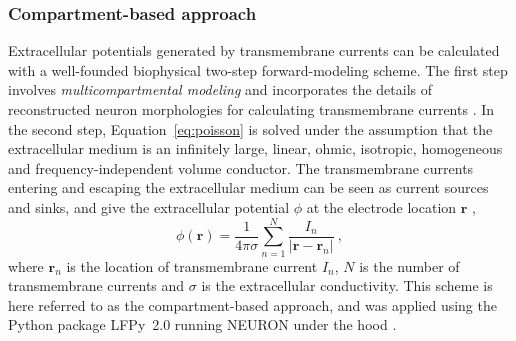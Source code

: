 \documentclass[preprint,10pt,authoryear]{elsarticle}
\begin{document}
\subsubsection{Compartment-based approach}\label{subsubsec:multicomp}
Extracellular potentials generated by transmembrane currents can be calculated with a well-founded biophysical two-step forward-modeling scheme. The first step involves \textit{multicompartmental modeling} and incorporates the details of reconstructed neuron morphologies for calculating transmembrane currents \citep{STERRATT2011}. In the second step, Equation~\eqref{eq:poisson} is solved under the assumption that the extracellular medium is an infinitely large, linear, ohmic, isotropic, homogeneous and frequency-independent volume conductor. The transmembrane currents entering and escaping the extracellular medium can be seen as current sources and sinks, and give the extracellular potential $\phi$ at the electrode location $\mathbf{r}$ \citep{Ness2020},
\begin{equation}
\phi(\mathbf{r}) = \frac{1}{4 \pi \sigma}\sum_{n=1}^N \frac{I_n}{|\mathbf{r} - \mathbf{r}_n|}~,
\label{eq:point_source}
\end{equation}
where $\mathbf{r}_n$ is the location of transmembrane current $I_n$, $N$ is the number of transmembrane currents and $\sigma$ is the extracellular conductivity. 
This scheme is here referred to as the compartment-based approach, and was applied using the Python package LFPy~2.0 running NEURON under the hood \citep{HAGEN2018,CARNEVALE2006}.
\end{document}
